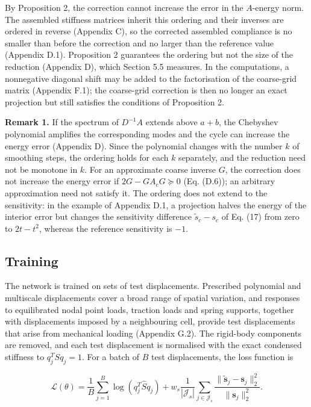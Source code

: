\documentclass[preprint,12pt,authoryear]{elsarticle}
\begin{document}
By Proposition 2, the correction cannot increase the error in the \(A\)-energy norm. The assembled stiffness matrices inherit this ordering and their inverses are ordered in reverse (Appendix C), so the corrected assembled compliance is no smaller than before the correction and no larger than the reference value (Appendix D.1). Proposition 2 guarantees the ordering but not the size of the reduction (Appendix D), which Section 5.5 measures. In the computations, a nonnegative diagonal shift may be added to the factorisation of the coarse-grid matrix (Appendix F.1); the coarse-grid correction is then no longer an exact projection but still satisfies the conditions of Proposition 2.

\textbf{Remark 1.} If the spectrum of \(D^{-1}A\) extends above \(a+b\), the Chebyshev polynomial amplifies the corresponding modes and the cycle can increase the energy error (Appendix D). Since the polynomial changes with the number \(k\) of smoothing steps, the ordering holds for each \(k\) separately, and the reduction need not be monotone in \(k\). For an approximate coarse inverse \(G\), the correction does not increase the energy error if \(2G-GA_cG\succeq0\) (Eq. (D.6)); an arbitrary approximation need not satisfy it. The ordering does not extend to the sensitivity: in the example of Appendix D.1, a projection halves the energy of the interior error but changes the sensitivity difference \(\widetilde s_c-s_c\) of Eq. (17) from zero to \(2t-t^2\), whereas the reference sensitivity is \(-1\).

\subsection{Training}

The network is trained on sets of test displacements. Prescribed polynomial and multiscale displacements cover a broad range of spatial variation, and responses to equilibrated nodal point loads, traction loads and spring supports, together with displacements imposed by a neighbouring cell, provide test displacements that arise from mechanical loading (Appendix G.2). The rigid-body components are removed, and each test displacement is normalised with the exact condensed stiffness to \(q_j^TSq_j=1\). For a batch of \(B\) test displacements, the loss function is

\[
\mathcal L(\theta)=\frac1B\sum_{j=1}^{B}\log(q_j^T\widehat S q_j)
 +w_s\frac1{|\mathcal J_s|}\sum_{j\in\mathcal J_s}
 \frac{\|\widetilde{\boldsymbol s}_j-\boldsymbol s_j\|_2^2}{\|\boldsymbol s_j\|_2^2}.
\tag{13}
\]
\end{document}
